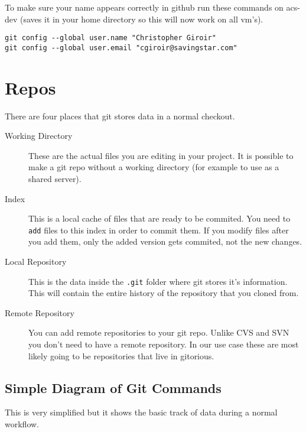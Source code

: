 \documentclass[letterpaper,12pt]{article}
\begin{document}
To make sure your name appears correctly in github run these commands on acs-dev
(saves it in your home directory so this will now work on all vm's).

\begin{verbatim}
git config --global user.name "Christopher Giroir"
git config --global user.email "cgiroir@savingstar.com"
\end{verbatim}

\section{Repos}

There are four places that git stores data in a normal checkout.

\begin{description}
\item [Working Directory] These are the actual files you are editing in your
  project. It is possible to make a git repo without a working directory (for
  example to use as a shared server).
\item [Index] This is a local cache of files that are ready to be commited. You
  need to \texttt{add} files to this index in order to commit them. If you modify
  files after you add them, only the added version gets commited, not the new
  changes.
\item [Local Repository] This is the data inside the \texttt{.git} folder where
  git stores it's information. This will contain the entire history of the
  repository that you cloned from.
\item [Remote Repository] You can add remote repositories to your git
  repo. Unlike CVS and SVN you don't need to have a remote repository. In our
  use case these are most likely going to be repositories that live in
  gitorious.
\end{description}

\subsection{Simple Diagram of Git Commands}

This is very simplified but it shows the basic track of data during a normal
workflow.

\end{document}
